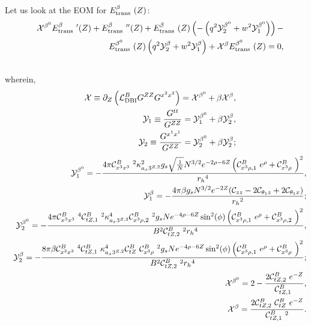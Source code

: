 Let us look at the EOM for $E_{\rm trans}^\beta\ (Z)$:
{\footnotesize
\begin{eqnarray}
\label{EtransbetaBUV}
& & {\cal X}^{\beta^0} 
   E_{\rm trans}^\beta\ '(Z)+E_{\rm trans}^\beta\ ''(Z)+E_{\rm trans}^\beta\ (Z) \left(-\left(q^2 {\cal Y}_2^{\beta^0}+w^2
{\cal Y}_1^{\beta^0}\right)\right)-\nonumber\\& & \quad E_{\rm trans}^{\beta^0}\ (Z) \left(q^2
   {\cal Y}_2^{\beta}+w^2 {\cal Y}_1^\beta \right)+{\cal X}^\beta 
   E_{\rm trans}^{\beta^0}\ (Z)=0,\nonumber\\
& &    
\end{eqnarray}
}
wherein,
\begin{eqnarray}
\label{Y1Y2Xprime-defs-i}
& & {\cal X} \equiv \partial_Z\left({\cal L}_{\rm DBI}^B G^{ZZ} {G^{x^2x^2}}\right) = {\cal X}^{\beta^0} + \beta {\cal X}^{\beta},\nonumber\\
& & {\cal Y}_1 \equiv \frac{{G^{tt}}}{G^{ZZ}} = {\cal Y}_1^{\beta^0} + \beta {\cal Y}_2^{\beta},\nonumber\\
& &{\cal Y}_2 \equiv \frac{{G^{x^1x^1}}}{G^{ZZ}} = {\cal Y}_2^{\beta^0} + \beta {\cal Y}_2^{\beta};
\end{eqnarray}
\begin{eqnarray}
\label{Y1Y2Xprime-defs-ii}
& & {\cal Y}_1^{\beta^0}=-\frac{4 \pi  {\cal C}_{x^3x^3}^B\ ^2
   \kappa_{a_x3^{Z,2}}^2 {g_s} \sqrt{\frac{1}{N}} N^{3/2}
   e^{-2 \rho -6 Z} \left({\cal C}_{x^3\rho,1}^B\  e^{\rho
   }+{\cal C}_{x^3\rho}^B\ \right)^2}{{r_h}^4},\nonumber\\
& & {\cal Y}_1^\beta = -\frac{4 \pi  \beta  {g_s}
   N^{3/2} e^{-2 Z} ({\cal C}_{zz}-2 {\cal C}_{\theta_1z}+2
  {\cal C}_{\theta_1x})}{{r_h}^2};\nonumber\\
& & {\cal Y}_2^{\beta^0}=-\frac{4 \pi  {\cal C}_{x^3x^3}^B\ ^4
   {\cal C}_{tZ,1}^B\ ^2 \kappa_{a_x3^{Z,2}}^4 {\cal C}_{x^3\rho, 2}^B\ ^2 {g_s} N e^{-4 \rho -6 Z} \sin ^2(\phi )
   \left({\cal C}_{x^3\rho,1}^B\  e^{\rho }+{\cal C}_{x^3\rho, 2}^B\ \right)^2}{B^2 {\cal C}_{tZ,2}^B\ ^2 {r_h}^4},\nonumber\\
& & {\cal Y}_2^{\beta}=-\frac{8 \pi  \beta  {\cal C}_{x^3x^3}^B\ ^4
   {\cal C}_{tZ,1}^B\  \kappa_{a_x3^{Z,2}}^4 {\cal C}_{tZ}^B\ 
   {\cal C}_{x^3\rho}^B\ ^2 {g_s} N e^{-4 \rho -6 Z} \sin
   ^2(\phi ) \left({\cal C}_{x^3\rho,1}^B\  e^{\rho
   }+{\cal C}_{x^3\rho}^B\ \right)^2}{B^2 {\cal C}_{tZ,2}^B\ ^2
   {r_h}^4};\nonumber\\
& & {\cal X}^{\beta^0}=2-\frac{2 {\cal C}_{tZ,2}^B\ 
   e^{-Z}}{{\cal C}_{tZ,1}^B\ },\nonumber\\
& & {\cal X}^{\beta}=\frac{2 {\cal C}_{tZ,2}^B\  {\cal C}_{tZ}^B\ 
   e^{-Z}}{{\cal C}_{tZ,1}^B\ ^2}.
\end{eqnarray}
